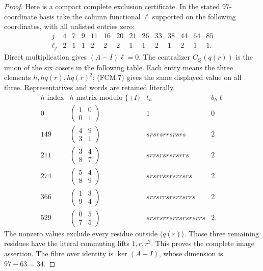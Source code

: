 \begin{proof}
Here is a compact complete exclusion certificate.  In the stated
$97$-coordinate basis take the column functional $\ell$ supported
on the following coordinates, with all unlisted entries zero:
\[
\begin{array}{c|rrrrrrrrrrrrr}
 j&4&7&9&11&16&20&21&26&33&38&44&64&85\\ \hline
 \ell_j&2&1&1&2&2&2&1&1&2&1&2&1&1.
\end{array}                                                   \tag{FCM.9}
\]
Direct multiplication gives $(A-I)\ell=0$.
The centralizer $C_Q(q(r))$ is the union of the six cosets in the
following table.  Each entry means the three elements
$h,hq(r),hq(r)^2$; (FCM.7) gives the same displayed value on all
three.  Representatives and words are retained literally.
\[
\begin{array}{c|c|c|c}
 h\text{ index}&h\text{ matrix modulo }\{\pm I\}
 &t_h&b_h\ell\\ \hline
0&\left(\begin{smallmatrix}1&0\\0&1\end{smallmatrix}\right)
 &1&0\\
149&\left(\begin{smallmatrix}4&9\\3&1\end{smallmatrix}\right)
 &srsrsrrsrsrs&2\\
211&\left(\begin{smallmatrix}3&4\\8&7\end{smallmatrix}\right)
 &srrsrsrsrsrrs&2\\
274&\left(\begin{smallmatrix}5&4\\8&9\end{smallmatrix}\right)
 &srsrrsrrsrrsrs&2\\
366&\left(\begin{smallmatrix}1&3\\9&4\end{smallmatrix}\right)
 &srrsrrsrsrrsrrs&2\\
529&\left(\begin{smallmatrix}0&5\\7&5\end{smallmatrix}\right)
 &srsrsrrsrrsrsrsrrs&2.
\end{array}                                                   \tag{FCM.10}
\]
The nonzero values exclude every residue outside $\langle q(r)\rangle$.
Those three remaining residues have the literal commuting lifts
$1,r,r^2$.  This proves the complete image assertion.  The fibre
over identity is $\ker(A-I)$, whose dimension is $97-63=34$.


\end{proof}
